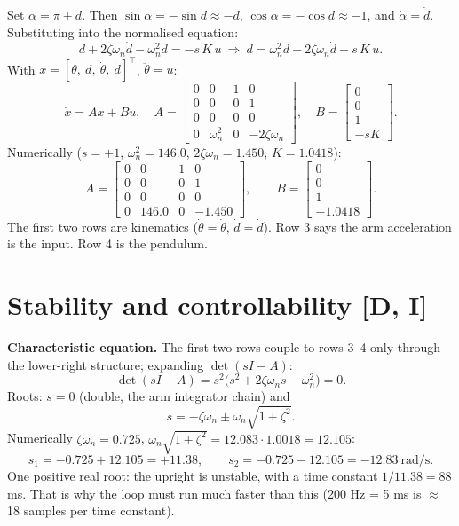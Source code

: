 \documentclass[11pt,a4paper]{article}
\begin{document}
Set $\alpha=\pi+d$. Then $\sin\alpha=-\sin d\approx-d$, $\cos\alpha=-\cos d\approx-1$, and $\dot\alpha=\dot d$. Substituting into the normalised equation:
\begin{equation*}
\ddot d+2\zeta\omega_n\dot d-\omega_n^2d=-s\,K\,u
\ \Longrightarrow\
\boxed{\ddot d=\omega_n^2d-2\zeta\omega_n\dot d-s\,K\,u .}
\end{equation*}
With $x=[\theta,\ d,\ \dot\theta,\ \dot d]^\top$, $\ddot\theta=u$:
\begin{equation*}
\dot x=Ax+Bu,\quad
A=\begin{bmatrix}0&0&1&0\\0&0&0&1\\0&0&0&0\\0&\omega_n^2&0&-2\zeta\omega_n\end{bmatrix},\quad
B=\begin{bmatrix}0\\0\\1\\-sK\end{bmatrix}.
\end{equation*}
Numerically ($s=+1$, $\omega_n^2=146.0$, $2\zeta\omega_n=1.450$, $K=1.0418$):
\begin{equation*}
A=\begin{bmatrix}0&0&1&0\\0&0&0&1\\0&0&0&0\\0&146.0&0&-1.450\end{bmatrix},\qquad
B=\begin{bmatrix}0\\0\\1\\-1.0418\end{bmatrix}.
\end{equation*}
The first two rows are kinematics ($\dot\theta=\dot\theta$, $\dot d=\dot d$). Row 3 says the arm acceleration is the input. Row 4 is the pendulum.


\section{Stability and controllability [D, I]}

\textbf{Characteristic equation.} The first two rows couple to rows 3–4 only through the lower-right structure; expanding $\det(sI-A)$:
\begin{equation*}
\det(sI-A)=s^2\bigl(s^2+2\zeta\omega_ns-\omega_n^2\bigr)=0 .
\end{equation*}
Roots: $s=0$ (double, the arm integrator chain) and
\begin{equation*}
s=-\zeta\omega_n\pm\omega_n\sqrt{1+\zeta^2}.
\end{equation*}
Numerically $\zeta\omega_n=0.725$, $\omega_n\sqrt{1+\zeta^2}=12.083\cdot1.0018=12.105$:
\begin{equation*}
s_1=-0.725+12.105=+11.38,\qquad s_2=-0.725-12.105=-12.83\ \text{rad/s}.
\end{equation*}
One positive real root: the upright is unstable, with a time constant $1/11.38=88$ ms. That is why the loop must run much faster than this (200 Hz = 5 ms is $\approx$ 18 samples per time constant).
\end{document}
